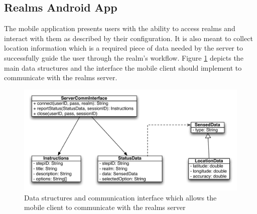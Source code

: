 \subsection{Realms Android App} %
\label{sub:realms_android_app}
The mobile application presents users with the ability to access realms and interact with them as described by their configuration. It is also meant to collect location information which is a required piece of data needed by the server to successfully guide the user through the realm's workflow. Figure \ref{fig.design.mobile_client} depicts the main data structures and the interface the mobile client should implement to communicate with the realms server.
\begin{figure}[H]
	\centering
	\includegraphics[width=0.9\linewidth]{fig/mobile_client}
	\caption{Data structures and communication interface which allows the mobile client to communicate with the realms server}
	\label{fig.design.mobile_client}
\end{figure}


